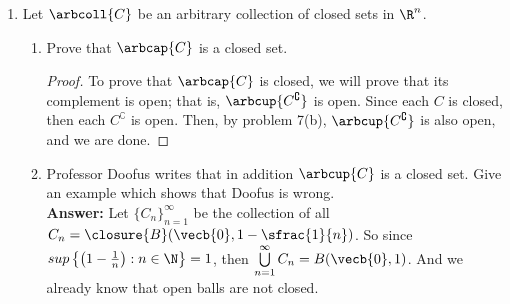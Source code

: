 \documentclass[letterpaper]{article}
\begin{document}
\begin{enumerate}
\pagebreak
\item Let $\arbcoll{C}$ be an arbitrary collection of closed sets in $\R^n$. 
	\begin{enumerate}
	\item Prove that $\arbcap{C}$ is a closed set.
	\begin{proof} To prove that $\arbcap{C}$ is closed, we will prove that its complement is open; that is, $\arbcup{C^\complement}$ is open. Since each $C$ is closed, then each $C^\complement$ is open. Then, by problem 7(b), $\arbcup{C^\complement}$ is also open, and we are done. 
	
	\end{proof}
	
	\item Professor Doofus writes that in addition $\arbcup{C}$ is a closed set. Give an example which shows that Doofus is wrong. \\
	\textbf{Answer:} Let $\{C_n\}_{n=1}^\infty$ be the collection of all $C_n=\closure{B}(\vecb{0},1-\sfrac{1}{n})$. So since $sup\left\lbrace\left(1-\frac{1}{n}\right):n\in\N\right\rbrace=1$, then $\bigcup\limits_{n=1}^\infty C_n=B(\vecb{0},1)$. And we already know that open balls are not closed. 
	\end{enumerate}
\end{enumerate}
\end{document}
